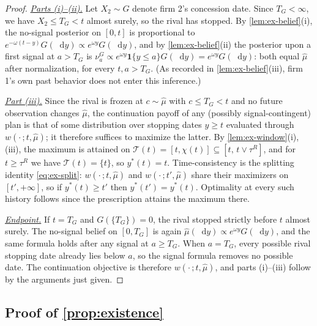 \documentclass[12pt,reqno]{article}
\newcommand{\de}{\mathop{}\!\mathrm{d}}
\theoremstyle{definition} \newtheorem{example}{Example}
\theoremstyle{definition} \newtheorem{condition}{Condition}
\theoremstyle{definition} \newtheorem{corollary}{Corollary}
\theoremstyle{definition} \newtheorem{claim}{Claim}
\theoremstyle{definition} \newtheorem{definition}{Definition}
\theoremstyle{definition} \newtheorem{conjecture}{Conjecture}
\theoremstyle{definition} \newtheorem{Lemma}{Lemma}
\theoremstyle{definition} \newtheorem{lemma}{Lemma}
\theoremstyle{plain} \newtheorem{theorem}{Theorem}
\theoremstyle{definition} \newtheorem{assumption}{Assumption}
\theoremstyle{definition} \newtheorem*{assumptionnonumber}{Assumption}
\theoremstyle{definition} \newtheorem*{theoremNoNumber}{Proposition}
\theoremstyle{definition}
\theoremstyle{definition}\newtheorem{proposition}{Proposition}
\theoremstyle{definition} \newtheorem{result}{Result}
\theoremstyle{definition} \newtheorem*{definitionNoNumber}{Definition}
\theoremstyle{definition} \newtheorem{Definition}{Definition}
\theoremstyle{definition} \newtheorem*{DefinitionNoNumber}{Definition}
\theoremstyle{definition} \newtheorem*{fact}{Fact}
\theoremstyle{definition} \newtheorem*{property}{Property}
\theoremstyle{definition} \newtheorem{remark}{Remark}
\begin{document}
\begin{proof}
\noindent \underline{\emph{Parts (i)--(ii).}} Let $X_2\sim G$ denote firm 2's concession date. Since $T_G<\infty$, we have $X_2\le T_G<t$ almost surely, so the rival has stopped. By \cref{lem:ex-belief}(i), the no-signal posterior on $[0,t]$ is proportional to $e^{-\omega(t-y)}G(\de y)\propto e^{\omega y}G(\de y)$, and by \cref{lem:ex-belief}(ii) the posterior upon a first signal at $a>T_G$ is $\nu^G_a\propto e^{\omega y}\mathbf 1\{y\le a\}G(\de y)=e^{\omega y}G(\de y)$: both equal $\hat\mu$ after normalization, for every $t,a>T_G$. (As recorded in \cref{lem:ex-belief}(iii), firm 1's own past behavior does not enter this inference.)

\noindent \underline{\emph{Part (iii).}} Since the rival is frozen at $c\sim\hat\mu$ with $c\le T_G<t$ and no future observation changes $\hat\mu$, the continuation payoff of any (possibly signal-contingent) plan is that of some distribution over stopping dates $y\ge t$ evaluated through $w(\cdot\,;t,\hat\mu)$; it therefore suffices to maximize the latter. By \cref{lem:ex-window}(i),(iii), the maximum is attained on $\mathcal T(t)=[t,\chi(t)]\subseteq[t,\,t\vee\tau^R]$, and for $t\ge\tau^R$ we have $\mathcal T(t)=\{t\}$, so $y^\ast(t)=t$. Time-consistency is the splitting identity \eqref{eq:ex-split}: $w(\cdot\,;t,\hat\mu)$ and $w(\cdot\,;t',\hat\mu)$ share their maximizers on $[t',+\infty]$, so if $y^\ast(t)\ge t'$ then $y^\ast(t')=y^\ast(t)$. Optimality at every such history follows since the prescription attains the maximum there.

\noindent \underline{\emph{Endpoint.}} If $t=T_G$ and $G(\{T_G\})=0$, the rival stopped strictly before $t$ almost surely. The no-signal belief on $[0,T_G]$ is again $\hat\mu(\de y)\propto e^{\omega y}G(\de y)$, and the same formula holds after any signal at $a\ge T_G$. When $a=T_G$, every possible rival stopping date already lies below $a$, so the signal formula removes no possible date. The continuation objective is therefore $w(\cdot\,;t,\hat\mu)$, and parts (i)--(iii) follow by the arguments just given.
\end{proof}

\subsection{Proof of \cref{prop:existence}}\label{app:ex-proof}
\end{document}
